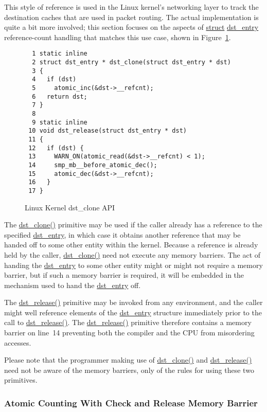 This style of reference is used in the Linux kernel's networking
layer to track the destination caches that are used in packet routing.
The actual implementation is quite a bit more involved; this section
focuses on the aspects of \url{struct} \url{dst_entry} reference-count
handling that matches this use case,
shown in Figure~\ref{fig:defer:Linux Kernel dst-clone API}.

\begin{figure}[htbp]
{ \scriptsize
\begin{verbatim}
  1 static inline
  2 struct dst_entry * dst_clone(struct dst_entry * dst)
  3 {
  4   if (dst)
  5     atomic_inc(&dst->__refcnt);
  6   return dst;
  7 }
  8 
  9 static inline
 10 void dst_release(struct dst_entry * dst)
 11 {
 12   if (dst) {
 13     WARN_ON(atomic_read(&dst->__refcnt) < 1);
 14     smp_mb__before_atomic_dec();
 15     atomic_dec(&dst->__refcnt);
 16   }
 17 }
\end{verbatim}
}
\caption{Linux Kernel dst\_clone API}
\label{fig:defer:Linux Kernel dst-clone API}
\end{figure}

The \url{dst_clone()} primitive may be used if the caller
already has a reference to the specified \url{dst_entry},
in which case it obtains another reference that may be handed off
to some other entity within the kernel.
Because a reference is already held by the caller, \url{dst_clone()}
need not execute any memory barriers.
The act of handing the \url{dst_entry} to some other entity might
or might not require a memory barrier, but if such a memory barrier
is required, it will be embedded in the mechanism used to hand the
\url{dst_entry} off.

The \url{dst_release()} primitive may be invoked from any environment,
and the caller might well reference elements of the \url{dst_entry}
structure immediately prior to the call to \url{dst_release()}.
The \url{dst_release()} primitive therefore contains a memory
barrier on line~14 preventing both the compiler and the CPU
from misordering accesses.

Please note that the programmer making use of \url{dst_clone()} and
\url{dst_release()} need not be aware of the memory barriers, only
of the rules for using these two primitives.

\subsubsection{Atomic Counting With Check and Release Memory Barrier}
\label{sec:defer:Atomic Counting With Check and Release Memory Barrier}

